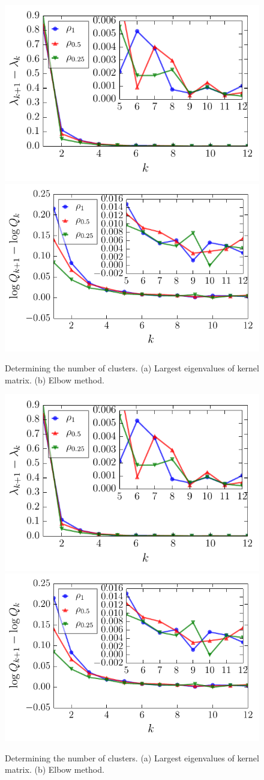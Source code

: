 \documentclass[aps,preprint,nofootinbib,floatfix]{revtex4-1}
\begin{document}
\begin{figure}
\includegraphics[width=.49\textwidth]{eigen_gap.pdf}
\includegraphics[width=.49\textwidth]{elbow.pdf}
\caption{
\label{fig:num_clusters}
Determining the number of clusters.
(a) Largest eigenvalues of kernel matrix.
(b) Elbow method.
}
\end{figure}

\begin{figure}
\includegraphics[width=.49\textwidth]{eigen_gap.pdf}
\includegraphics[width=.49\textwidth]{elbow.pdf}
\caption{
\label{fig:num_clusters}
Determining the number of clusters.
(a) Largest eigenvalues of kernel matrix.
(b) Elbow method.
}
\end{figure}


\end{document}
